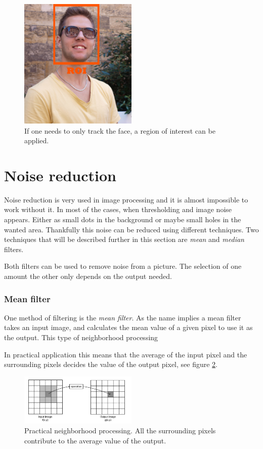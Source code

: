 {\begin{figure}[htbp] 
\centering 
\includegraphics[width=0.5\textwidth]{Pictures/Theory/RegionOfInterest.jpg} 
\caption{If one needs to only track the face, a region of interest can be applied.} 
\label{fig:Region of Interest} 
\end{figure} 

\section{Noise reduction}
Noise reduction is very used in image processing and it is almost impossible to work without it. In most of the cases, when thresholding and image noise appears. Either as small dots in the background or maybe small holes in the wanted area. Thankfully this noise can be reduced using different techniques. Two techniques that will be described further in this section are \textit{mean} and \textit{median} filters.

Both filters can be used to remove noise from a picture. The selection of one amount the other only depends on the output needed.

\subsubsection{Mean filter}
One method of filtering is the \textit{mean filter}. As the name implies a mean filter takes an input image, and calculates the mean value of a given pixel to use it as the output. This type of neighborhood processing

 In practical application this means that the average of the input pixel and the surrounding pixels decides the value of the output pixel, see figure \ref{fig:neigh_pros}.


\begin{figure}[htbp] 
\centering 
\includegraphics[width=0.5\textwidth]{Pictures/Theory/neighborhood_processing.png} 
\caption{Practical neighborhood processing. All the surrounding pixels contribute to the average value of the output.} 
\label{fig:neigh_pros} 
\end{figure}

}
